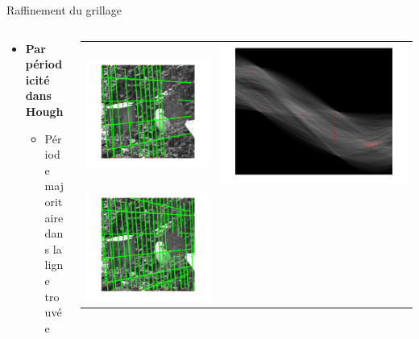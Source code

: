 \begin{frame}{Raffinement du grillage}
	\begin{columns}
		\begin{column}{5cm}
		\begin{itemize}
			\item\textbf{Par périodicité dans Hough}
			\begin{itemize}
				\item Période majoritaire dans la ligne trouvée
			\end{itemize}
		\end{itemize}
		\end{column}
		\begin{column}{5cm}
	\begin{tabular}{cc}
		\includegraphics[width = 0.5 \columnwidth]{fig/grillagesansraf.png}
		& \includegraphics[width = 0.5 \columnwidth]{fig/houghsansraf.png} \\
		\includegraphics[width = 0.5 \columnwidth]{fig/grillageavecraf.png}

\end{tabular}
\end{column}
\end{columns}
\end{frame}

